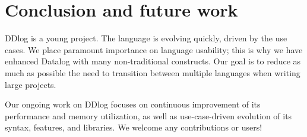 \section{Conclusion and future work}\label{sec-conclusions}

DDlog is a young project.  The language is evolving quickly, driven by
the use cases.  We place paramount importance on language usability;
this is why we have enhanced Datalog with many non-traditional
constructs.  Our goal is to reduce as much as possible the need to
transition between multiple languages when writing large projects.

Our ongoing work on DDlog focuses on continuous improvement of its
performance and memory utilization, as well as use-case-driven
evolution of its syntax, features, and libraries.  We welcome any
contributions or users!
